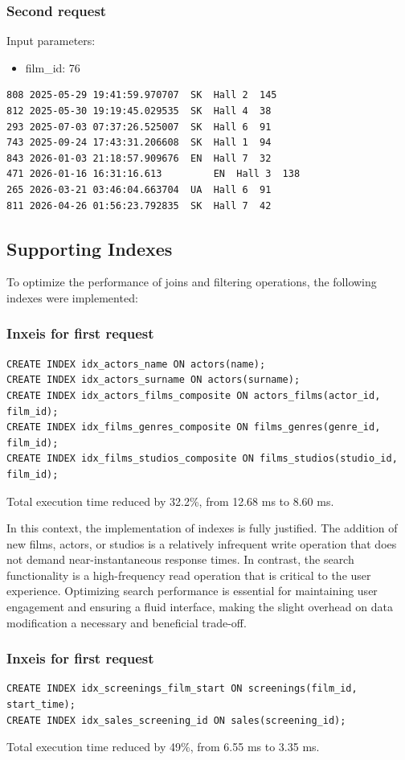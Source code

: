 \documentclass[11pt, a4paper]{article}
\begin{document}
\subsubsection{Second request}
Input parameters:
\begin{itemize}
    \item film\_id: 76
\end{itemize}
\begin{lstlisting}
808	2025-05-29 19:41:59.970707	SK	Hall 2	145
812	2025-05-30 19:19:45.029535	SK	Hall 4	38
293	2025-07-03 07:37:26.525007	SK	Hall 6	91
743	2025-09-24 17:43:31.206608	SK	Hall 1	94
843	2026-01-03 21:18:57.909676	EN	Hall 7	32
471	2026-01-16 16:31:16.613	        EN	Hall 3	138
265	2026-03-21 03:46:04.663704	UA	Hall 6	91
811	2026-04-26 01:56:23.792835	SK	Hall 7	42
\end{lstlisting}
\subsection{Supporting Indexes}
To optimize the performance of joins and filtering operations, the following indexes were implemented:
\subsubsection{Inxeis for first request}
\begin{lstlisting}
CREATE INDEX idx_actors_name ON actors(name);
CREATE INDEX idx_actors_surname ON actors(surname);
CREATE INDEX idx_actors_films_composite ON actors_films(actor_id, film_id);
CREATE INDEX idx_films_genres_composite ON films_genres(genre_id, film_id);
CREATE INDEX idx_films_studios_composite ON films_studios(studio_id, film_id);
\end{lstlisting}
Total execution time reduced by 32.2\%, from 12.68 ms to 8.60 ms.

In this context, the implementation of indexes is fully justified.
The addition of new films, actors, or studios is a relatively infrequent write operation that does not demand near-instantaneous response times.
In contrast, the search functionality is a high-frequency read operation that is critical to the user experience.
Optimizing search performance is essential for maintaining user engagement and ensuring a fluid interface,
making the slight overhead on data modification a necessary and beneficial trade-off.

\subsubsection{Inxeis for first request}
\begin{lstlisting}
CREATE INDEX idx_screenings_film_start ON screenings(film_id, start_time);
CREATE INDEX idx_sales_screening_id ON sales(screening_id);
\end{lstlisting}
Total execution time reduced by 49\%, from 6.55 ms to 3.35 ms.
\end{document}
